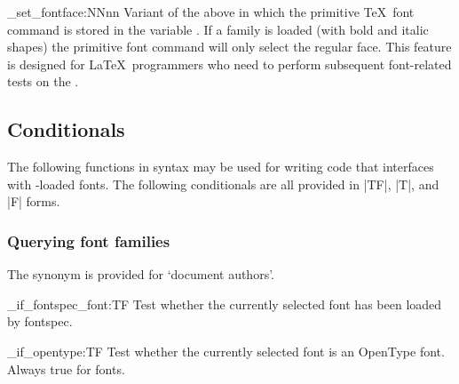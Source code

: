 \documentclass[a4paper]{l3doc}
\begin{document}
\begin{macro}{\fontspec_set_fontface:NNnn}
Variant of the above in which the primitive \TeX\ font command is stored in
the variable .
If a family is loaded (with bold and italic shapes) the primitive font
command will only select the regular face.
This feature is designed for \LaTeX\ programmers who need to
perform subsequent font-related tests on the .
\end{macro}


\subsection{Conditionals}

The following functions in  syntax may be used
for writing code that interfaces with -loaded fonts.
The following conditionals are all provided in |TF|, |T|, and |F| forms.

\subsubsection{Querying font families}

The synonym  is provided for `document authors'.


\begin{macro}{\fontspec_if_fontspec_font:TF}
Test whether the currently selected font has been loaded by fontspec.
\end{macro}


\begin{macro}{\fontspec_if_opentype:TF}
Test whether the currently selected font is an OpenType font.
Always true for \LuaTeX{} fonts.
\end{macro}
\end{document}
